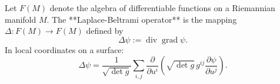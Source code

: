 Let $F(M)$ denote the algebra of differentiable functions on a Riemannian manifold $M$. The **Laplace-Beltrami operator** is the mapping $\Delta: F(M) \to F(M)$ defined by
$$\Delta\psi := \operatorname{div} \operatorname{grad} \psi.$$
In local coordinates on a surface:
$$\Delta\psi = \frac{1}{\sqrt{\det g}} \sum_{i,j} \frac{\partial}{\partial u^i}\left(\sqrt{\det g} \, g^{ij} \frac{\partial \psi}{\partial u^j}\right).$$